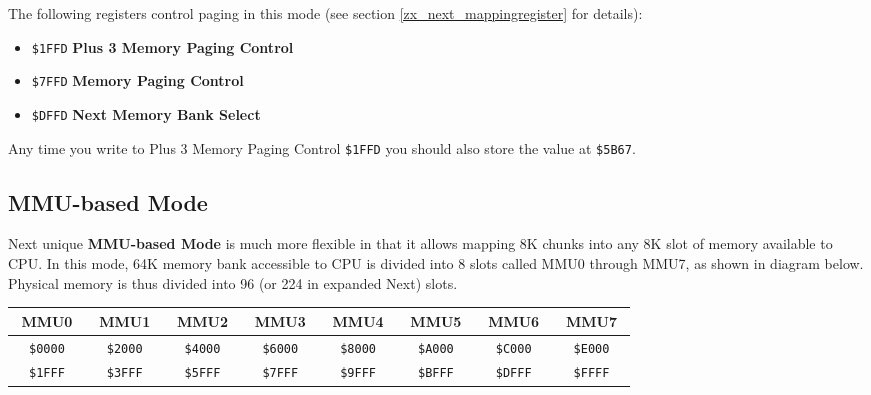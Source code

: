\documentclass[12pt,twoside,openright,a4paper]{book}
\newcommand{\notet}{\rule{0pt}{2.4ex}}
\newcommand{\noteb}{\rule[-1.3ex]{0pt}{0pt}}
\begin{document}
The following registers control paging in this mode (see section \ref{zx_next_mappingregister} for details):

\begin{itemize}[topsep=1pt,itemsep=1pt]
	\item {\tt \$1FFD} \textbf{Plus 3 Memory Paging Control}
	\item {\tt \$7FFD} \textbf{Memory Paging Control}
	\item {\tt \$DFFD} \textbf{Next Memory Bank Select}
\end{itemize}

Any time you write to Plus 3 Memory Paging Control {\tt \$1FFD} you should also store the value at {\tt \$5B67}.

\subsection{MMU-based Mode}
\label{zx_next_bank_mmu_mode}

Next unique \textbf{MMU-based Mode} is much more flexible in that it allows mapping 8K chunks into any 8K slot of memory available to CPU. In this mode, 64K memory bank accessible to CPU is divided into 8 slots called MMU0 through MMU7, as shown in diagram below. Physical memory is thus divided into 96 (or 224 in expanded Next) slots.

\begingroup
	\setlength{\tabcolsep}{1pt}
	\begin{tabular}{|cccc|cccc|cccc|cccc|cccc|cccc|cccc|cccc|}
		\hline
		\multicolumn{4}{|c}{MMU0}\notet\noteb & 
			\multicolumn{4}{|c}{MMU1} & 
			\multicolumn{4}{|c}{MMU2} & 
			\multicolumn{4}{|c}{MMU3} & 
			\multicolumn{4}{|c}{MMU4} & 
			\multicolumn{4}{|c}{MMU5} & 
			\multicolumn{4}{|c}{MMU6} & 
			\multicolumn{4}{|c|}{MMU7} \\
		\hline
		\colnoline{$\leftarrow$}\notet & \multicolumn{2}{c}{\tt \$0000} & \colnoline{} &
			\colnoline{$\leftarrow$}\notet & \multicolumn{2}{c}{\tt \$2000} & \colnoline{} &
			\colnoline{$\leftarrow$}\notet & \multicolumn{2}{c}{\tt \$4000} & \colnoline{} &
			\colnoline{$\leftarrow$}\notet & \multicolumn{2}{c}{\tt \$6000} & \colnoline{} &
			\colnoline{$\leftarrow$}\notet & \multicolumn{2}{c}{\tt \$8000} & \colnoline{} &
			\colnoline{$\leftarrow$}\notet & \multicolumn{2}{c}{\tt \$A000} & \colnoline{} &
			\colnoline{$\leftarrow$}\notet & \multicolumn{2}{c}{\tt \$C000} & \colnoline{} &
			\colnoline{$\leftarrow$}\notet & \multicolumn{2}{c}{\tt \$E000} & \colnoline{} \\
		\colnoline{} & \multicolumn{2}{c}{\tt \$1FFF} & \colnoline{$\rightarrow$} &
			\colnoline{} & \multicolumn{2}{c}{\tt \$3FFF} & \colnoline{$\rightarrow$} &
			\colnoline{} & \multicolumn{2}{c}{\tt \$5FFF} & \colnoline{$\rightarrow$} &
			\colnoline{} & \multicolumn{2}{c}{\tt \$7FFF} & \colnoline{$\rightarrow$} &
			\colnoline{} & \multicolumn{2}{c}{\tt \$9FFF} & \colnoline{$\rightarrow$} &
			\colnoline{} & \multicolumn{2}{c}{\tt \$BFFF} & \colnoline{$\rightarrow$} &
			\colnoline{} & \multicolumn{2}{c}{\tt \$DFFF} & \colnoline{$\rightarrow$} &
			\colnoline{} & \multicolumn{2}{c}{\tt \$FFFF} & \colnoline{$\rightarrow$} \\
	\end{tabular}
\endgroup
\end{document}
